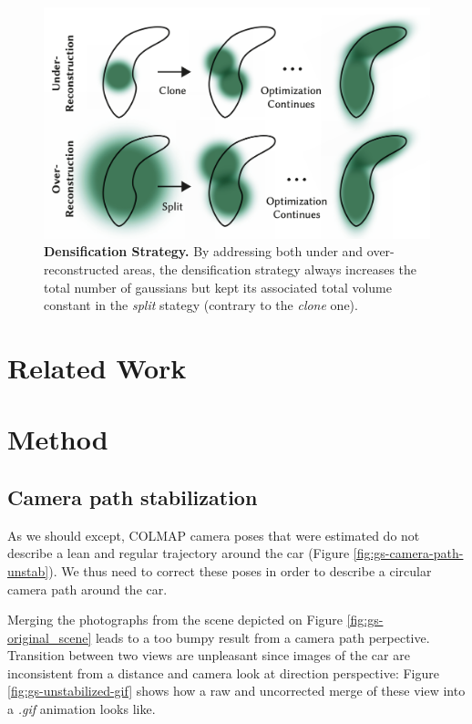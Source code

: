 \begin{figure}[htb!]
  \center
\includegraphics[width=.7\linewidth]{images/gaussiansplatting/densification-strategy.png}
\caption{\textbf{Densification Strategy.} By addressing both under and over-reconstructed areas, the densification strategy always increases the total number of gaussians but kept its associated total volume  constant in the \textit{split} stategy (contrary to the \textit{clone} one).}
\label{fig:gs-densification}
\end{figure}

\section{Related Work}

\section{Method}
\subsection{Camera path stabilization}

As we should except, COLMAP camera poses that were estimated do not describe a lean and regular trajectory around the car (Figure \ref{fig:gs-camera-path-unstab}). We thus need to correct these poses in order to describe a circular camera path around the car. 


Merging the photographs from the scene depicted on Figure \ref{fig:gs-original_scene} leads to a too bumpy result from a camera path perpective. Transition between two views are unpleasant since images of the car are inconsistent from a distance and camera look at direction perspective: Figure \ref{fig:gs-unstabilized-gif} shows how a raw and uncorrected merge of these view into a \textit{.gif} animation looks like. 

\begin{center}
  \label{fig:gs-unstabilized-gif}
\end{center}

